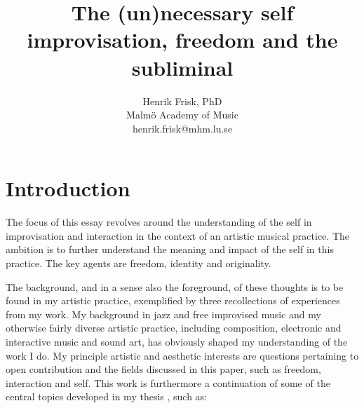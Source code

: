 \documentclass[a4paper]{article}
\title{The (un)necessary self\\\vspace{.6cm}
\large{improvisation, freedom and the subliminal}}
\author{Henrik Frisk, PhD\\{\small Malmö Academy of Music}\\{\small henrik.frisk@mhm.lu.se}}
\date{}
\begin{document}
\maketitle

\thispagestyle{empty}


\noindent

\section*{Introduction}

The focus of this essay revolves around the understanding of the self in improvisation and interaction in the context of an artistic musical practice. The ambition is to further understand the meaning and impact of the self in this practice. The key agents are freedom, identity and originality.

The background, and in a sense also the foreground, of these thoughts is to be found in my artistic practice, exemplified by three recollections of experiences from my work. My background in jazz and free improvised music and my otherwise fairly diverse artistic practice, including composition, electronic and interactive music and sound art, has obviously shaped my understanding of the work I do. My principle artistic and aesthetic interests are questions pertaining to open contribution and the fields discussed in this paper, such as freedom, interaction and self. This work is furthermore a continuation of some of the central topics developed in my thesis \citep{frisk08}, such as:
\end{document}

